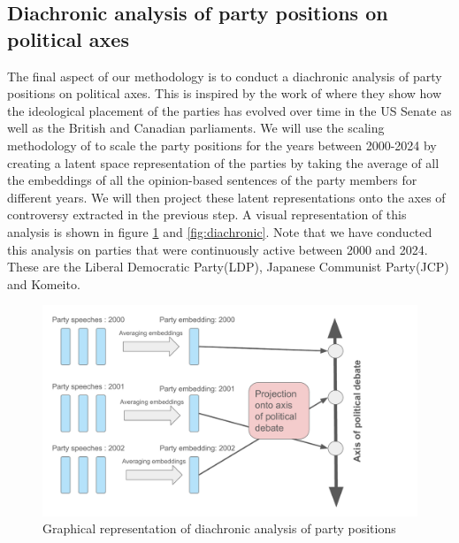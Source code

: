 \documentclass[final,5p,times,twocolumn,authoryear]{elsarticle}
\begin{document}
\subsection{Diachronic analysis of party positions on political axes}
\label{section: diachronic analysis}
The final aspect of our methodology is to conduct a diachronic analysis of party positions on political axes. This is inspired by the work of \citeauthor{Word-embeddings-for-analysis-of-ideological-placement} where they show how the ideological placement of the parties has evolved over time in the US Senate as well as the British and Canadian parliaments. We will use the scaling methodology of \citeauthor{kato2024lupinllmbasedpoliticalideology} to scale the party positions for the years between 2000-2024 by creating a latent space representation of the parties by taking the average of all the embeddings of all the opinion-based sentences of the party members for different years. We will then project these latent representations onto the axes of controversy extracted in the previous step. A visual representation of this analysis is shown in figure \ref{fig:diachronic analysis} and \ref{fig:diachronic}. Note that we have conducted this analysis on parties that were continuously active between 2000 and 2024. These are the Liberal Democratic Party(LDP), Japanese Communist Party(JCP) and Komeito. 
\begin{figure}[h]
\centering
  \centering
  \includegraphics[width=1\linewidth]{figs/diachronic projection.pdf}
  \caption{Graphical representation of diachronic analysis of party positions}
  \label{fig:diachronic analysis}
\end{figure}
\end{document}
